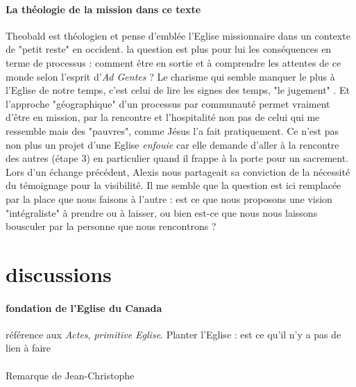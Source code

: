  
\paragraph{La théologie de la mission dans ce texte} Theobald est théologien et pense d'emblée l'Eglise missionnaire dans un contexte de "petit reste" en occident. la question est plus pour lui les conséquences en terme de processus : comment être en sortie et à comprendre les attentes de ce monde selon l'esprit d'\textit{Ad Gentes} ?  Le charisme qui semble manquer le plus à l'Eglise de notre temps, c'est celui de lire les signes des temps, "le jugement" \cite[p 392]{theobald_urgences_2017}. Et l'approche "géographique" d'un processus par communauté permet vraiment d'être en mission, par la rencontre et l'hospitalité non pas de celui qui me ressemble mais des "pauvres", comme Jésus l'a fait pratiquement.
Ce n'est pas non plus un projet d'une Eglise \textit{enfouie} car elle demande d'aller à la rencontre des autres (étape 3) en particulier quand il frappe à la porte pour un sacrement. Lors d'un échange précédent, Alexis nous partageait sa conviction de la nécessité du témoignage pour la visibilité. Il me semble que la question est ici remplacée par la place que nous faisons à l'autre : est ce que nous proposons une vision "intégraliste" à prendre ou à laisser, ou bien est-ce que nous nous laissons bousculer par la personne que nous rencontrons ?   


 \section{discussions}

\paragraph{fondation de l'Eglise du Canada} référence aux \textit{Actes}, \textit{primitive Eglise}. Planter l'Eglise : est ce qu'il n'y a pas de lien à faire

\paragraph{} Remarque de Jean-Christophe

